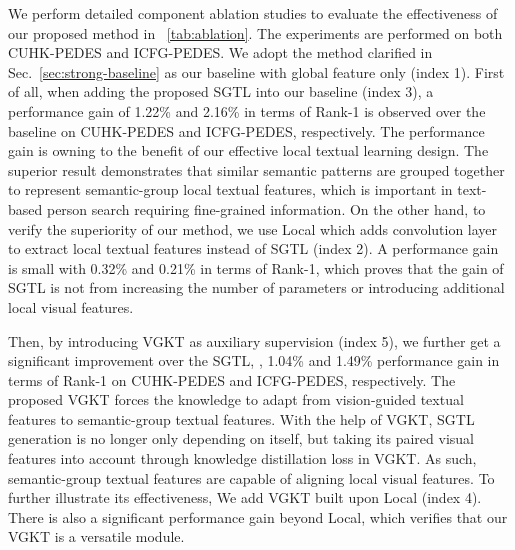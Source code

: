 We perform detailed component ablation studies to evaluate the effectiveness of our proposed method in \tablename~\ref{tab:ablation}. The experiments are performed on both CUHK-PEDES and ICFG-PEDES. 
We adopt the method clarified in Sec.~\ref{sec:strong-baseline} as our baseline with global feature only (index 1). 
First of all, when adding the proposed SGTL into our baseline (index 3), a performance gain of 1.22\% and 2.16\% in terms of Rank-1 is observed over the baseline on CUHK-PEDES and ICFG-PEDES, respectively. The performance gain is owning to the benefit of our effective local textual learning design.
The superior result demonstrates that  similar semantic patterns are grouped
together to represent semantic-group local textual features, which is important in text-based person search requiring fine-grained information.
On the other hand, to verify the superiority of our method, we use Local which adds  convolution layer to extract local textual features instead of SGTL (index 2). A performance gain is small with 0.32\% and 0.21\% in terms of Rank-1,
which proves that the gain of SGTL is not from increasing the number of parameters or introducing additional local visual features.


Then, by introducing VGKT as auxiliary supervision (index 5), we further get a significant improvement over the SGTL, \eg, 1.04\% and 1.49\% performance gain in terms of Rank-1 on CUHK-PEDES and ICFG-PEDES, respectively. 
The proposed VGKT forces the knowledge to adapt from vision-guided textual features to semantic-group textual features. With the help of VGKT,
SGTL generation is no longer only depending on itself, but taking its paired visual features into account through knowledge distillation loss in VGKT. As such, semantic-group textual features are capable of aligning local visual features.
To further illustrate its effectiveness, We add VGKT built upon Local (index 4).
There is also a significant performance gain beyond Local, which verifies that our VGKT is a versatile module.








